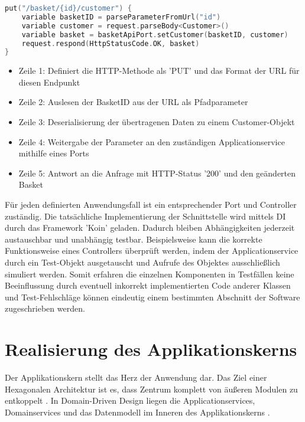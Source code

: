 \begin{minipage}{\linewidth} %
\begin{lstlisting}[caption={Beispiel eines Controllers zum aktualiseren von Kundendaten}, label={lst:controller}, language=Kotlin]
put("/basket/{id}/customer") { 
	variable basketID = parseParameterFromUrl("id")
	variable customer = request.parseBody<Customer>()  
	variable basket = basketApiPort.setCustomer(basketID, customer)
	request.respond(HttpStatusCode.OK, basket)
}
\end{lstlisting}

\begin{itemize}[noitemsep,nolistsep]
	\item Zeile 1: Definiert die HTTP-Methode als 'PUT' und das Format der URL für diesen Endpunkt
	\item Zeile 2: Auslesen der BasketID aus der URL als Pfadparameter
	\item Zeile 3: Deserialisierung der übertragenen Daten zu einem Customer-Objekt
	\item Zeile 4: Weitergabe der Parameter an den zuständigen Applicationservice mithilfe eines Ports
	\item Zeile 5: Antwort an die Anfrage mit HTTP-Status '200' und den geänderten Basket
\end{itemize}
\end{minipage}

Für jeden definierten Anwendungsfall ist ein entsprechender Port und Controller zuständig. Die tatsächliche Implementierung der Schnittstelle wird mittels \Gls{DI} durch das Framework 'Koin' geladen. Dadurch bleiben Abhängigkeiten jederzeit austauschbar und unabhängig testbar. Beispielsweise kann die korrekte Funktionsweise eines Controllers überprüft werden, indem der Applicationservice durch ein Test-Objekt ausgetauscht und Aufrufe des Objektes ausschließlich simuliert werden. Somit erfahren die einzelnen Komponenten in Testfällen keine Beeinflussung durch eventuell inkorrekt implementierten Code anderer Klassen und Test-Fehlschläge können eindeutig einem bestimmten Abschnitt der Software zugeschrieben werden. \cite{DI_2007, Lindooren.2007}

\section{Realisierung des Applikationskerns}

Der Applikationskern stellt das Herz der Anwendung dar. Das Ziel einer Hexagonalen Architektur ist es, dass Zentrum komplett von äußeren Modulen zu entkoppelt \cite{Cockburn.Hexagonal}. In Domain-Driven Design liegen die Applicationservices, Domainservices und das Datenmodell im Inneren des Applikationskerns \cite[S. 125ff.]{Vernon.2015}. 

